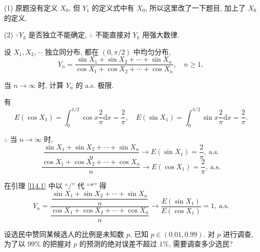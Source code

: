 \documentclass[color=black,device=normal,lang=cn]{elegantnote}
\numberwithin{equation}{section}
\theoremstyle{plain}
\numberwithin{exercise}{exsection}
\begin{document}
\begin{note}
    (1) 原题没有定义 $X_0$, 但 $Y_1$ 的定义式中有 $X_0$, 所以这里改了一下题目, 加上了 $X_0$ 的定义.

    (2) $\because Y_k$ 是否独立不能确定, $\therefore$ 不能直接对 $Y_k$ 用强大数律.
\end{note}
\begin{exercise}\label{ex7.10}
    设 $X_1,X_2,\cdots$ 独立同分布, 都在 $(0,\pi/2)$ 中均匀分布,
    \[Y_n=\dfrac{\sin X_1+\sin X_2+\cdots+\sin X_n}{\cos X_1+\cos X_2+\cdots+\cos X_n},\quad n\geq1,\]
    
    当 $n\to\infty$ 时, 计算 $Y_n$ 的 a.s. 极限.
\end{exercise}
\begin{solution}
    有
    \[E(\cos X_1)=\int_0^{\pi/2}\cos x\dfrac{2}{\pi}\mathrm{d}x=\dfrac{2}{\pi},\quad E(\sin X_1)=\int_0^{\pi/2}\sin x\dfrac{2}{\pi}\mathrm{d}x=\dfrac{2}{\pi}.\]

    $\therefore$ 当 $n\to\infty$ 时,
    \[\dfrac{\sin X_1+\sin X_2+\cdots+\sin X_n}{n}\to E(\sin X_1)=\dfrac{2}{\pi},\ \text{a.s.}\]
    \[\dfrac{\cos X_1+\cos X_2+\cdots+\cos X_n}{n}\to E(\cos X_1)=\dfrac{2}{\pi},\ \text{a.s.}\]

    在引理 \ref{l14.1} 中以 ``$/$'' 代 ``$*$'' 得
    \[Y_n=\dfrac{\dfrac{\sin X_1+\sin X_2+\cdots+\sin X_n}{n}}{\dfrac{\cos X_1+\cos X_2+\cdots+\cos X_n}{n}}\to\dfrac{E(\sin X_1)}{E(\cos X_1)}=1,\ \text{a.s.}\]
\end{solution}
\addtocounter{exercise}{3}
\begin{exercise}%
    设选民中赞同某候选人的比例是未知数 $p$, 已知 $p\in(0.01,0.99)$. 对 $p$ 进行调查, 为了以 $99\%$ 的把握对 $p$ 的预测的绝对误差不超过 $1\%$, 需要调查多少选民?
\end{exercise}
\end{document}
